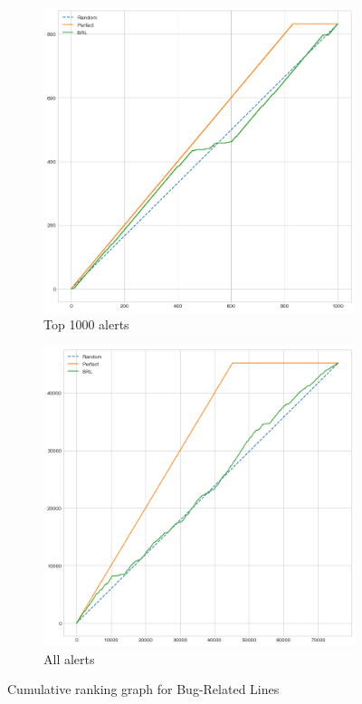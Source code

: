\begin{figure}[H]
	\begin{subfigure}{.5\textwidth}
		\centering
		\includegraphics[scale=0.3]{./src/brls/brls_cumulative_graph_top1000.png}
		\caption{Top 1000 alerts}\label{}
	\end{subfigure}%
	\begin{subfigure}{.5\textwidth}
		\centering
		\includegraphics[scale=0.3]{./src/brls/brls_cumulative_graph_all.png}
		\caption{All alerts}\label{}
	\end{subfigure}
	\caption{Cumulative ranking graph for Bug-Related Lines}
	\label{results:cumulative_brls}
\end{figure}


